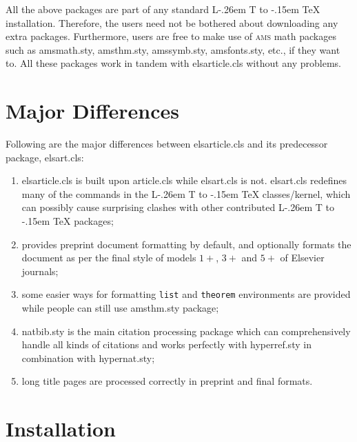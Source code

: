 \documentclass[a4paper,12pt]{article}
\makeatletter
\def\file#1{\textsf{#1}\xspace}
\DeclareRobustCommand{\LaTeX}{L\kern-.26em%
        {\sbox\z@ T%
         \vbox to\ht\z@{\hbox{\check@mathfonts
           \fontsize\sf@size\z@
           \math@fontsfalse\selectfont
          A\,}%
         \vss}%
        }%
     \kern-.15em%
    \TeX}
\makeatother
\begin{document}
All the above packages are part of any standard \LaTeX{} installation.
Therefore, the users need not be bothered about downloading any
extra packages.  Furthermore, users are free to make use of \textsc{ams}
math packages such as \file{amsmath.sty}, \file{amsthm.sty},
\file{amssymb.sty}, \file{amsfonts.sty}, etc., if they want to.  All
these packages work in tandem with \file{elsarticle.cls} without
any problems.

\section{Major Differences}

Following are the major differences between \file{elsarticle.cls}
and its predecessor package, \file{elsart.cls}:

\begin{enumerate}[\textbullet]
\item \file{elsarticle.cls} is built upon \file{article.cls}
while \file{elsart.cls} is not. \file{elsart.cls} redefines
many of the commands in the \LaTeX{} classes/kernel, which can
possibly cause surprising clashes with other contributed
\LaTeX{} packages;

\item provides preprint document formatting by default, and
optionally formats the document as per the final
style of models $1+$, $3+$ and $5+$ of Elsevier journals;

\item some easier ways for formatting \verb+list+ and
\verb+theorem+ environments are provided while people can still
use \file{amsthm.sty} package;

\item \file{natbib.sty} is the main citation processing package
  which can comprehensively handle all kinds of citations and
works perfectly with \file{hyperref.sty} in combination with
\file{hypernat.sty};

\item long title pages are processed correctly in preprint and
  final formats.

\end{enumerate}

\section{Installation}
\end{document}
